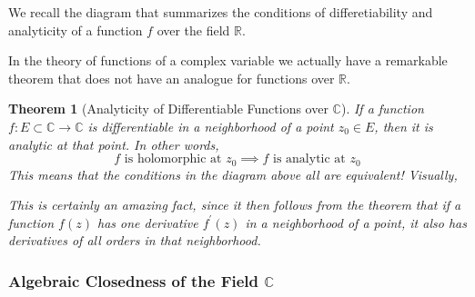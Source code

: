 \documentclass{article}
\newtheorem{theorem}{Theorem}[section]
\theoremstyle{remark}
\theoremstyle{definition}
\begin{document}
We recall the diagram that summarizes the conditions of differetiability and analyticity of a function $f$ over the field $\mathbb{R}$. 
\begin{center}
\end{center}
In the theory of functions of a complex variable we actually have a remarkable theorem that does not have an analogue for functions over $\mathbb{R}$. 

\begin{theorem}[Analyticity of Differentiable Functions over $\mathbb{C}$]
If a function $f: E \subset \mathbb{C} \longrightarrow \mathbb{C}$ is differentiable in a neighborhood of a point $z_0 \in E$, then it is analytic at that point. In other words, 
\[f \text{ is holomorphic at } z_0 \implies f \text{ is analytic at } z_0\]
This means that the conditions in the diagram above all are equivalent! Visually, 
\begin{center}
\end{center}
This is certainly an amazing fact, since it then follows from the theorem that if a function $f(z)$ has one derivative $f^\prime (z)$ in a neighborhood of a point, it also has derivatives of all orders in that neighborhood. 
\end{theorem}

\subsubsection[Algebraic Closedness of the Field C]{Algebraic Closedness of the Field $\mathbb{C}$}
\end{document}
